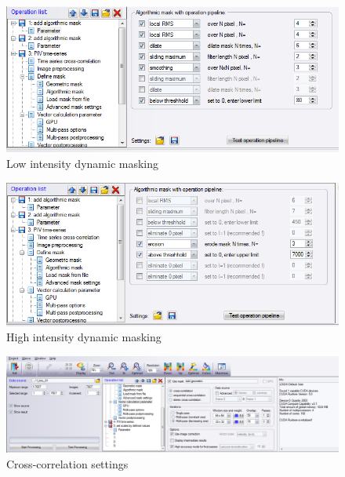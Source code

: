 \begin{figure}[H] %
	\centering%
  \includegraphics[width=\textwidth]{figures/Chapter_1/mask_1.PNG}
	\caption{Low intensity dynamic masking}
\end{figure}
\begin{figure}[H] %
	\centering%
  \includegraphics[width=\textwidth]{figures/Chapter_1/mask_2.PNG}
	\caption{High intensity dynamic masking}
\end{figure}
\begin{figure}[H] %
	\centering%
  \includegraphics[width=\textwidth]{figures/Chapter_1/PIV-2.PNG}
	\caption{Cross-correlation settings}
\end{figure}
